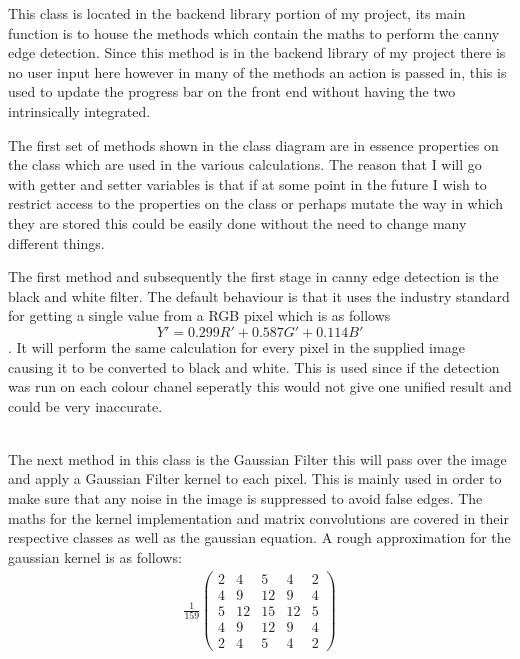 \begin{FlushLeft}
\begin{enumerate}
    This class is located in the backend library portion of my project, its main function is to house the methods which contain the maths to perform the canny edge detection. Since this method is in the backend library of my project there is no user input here however in many of the methods an action is passed in, this is used to update the progress bar on the front end without having the two intrinsically integrated. \\ \bk

    The first set of methods shown in the class diagram are in essence properties on the class which are used in the various calculations. The reason that I will go with getter and setter variables is that if at some point in the future I wish to restrict access to the properties on the class or perhaps mutate the way in which they are stored this could be easily done without the need to change many different things. \\ \bk

    The first method and subsequently the first stage in canny edge detection is the black and white filter. The default behaviour is that it uses the industry standard for getting a single value from a RGB pixel which is as follows $$ Y' = 0.299R' + 0.587G' + 0.114B' $$.  It will perform the same calculation for every pixel in the supplied image causing it to be converted to black and white. This is used since if the detection was run on each colour chanel seperatly this would not give one unified result and could be very inaccurate.\\ 

    \\ \bk

    The next method in this class is the Gaussian Filter this will pass over the image and apply a Gaussian Filter kernel to each pixel. This is mainly used in order to make sure that any noise in the image is suppressed to avoid false edges. The maths for the kernel implementation and matrix convolutions are covered in their respective classes as well as the gaussian equation. A rough approximation for the gaussian kernel is as follows:\\

    \begin{gather*}
        \frac{1}{159}\begin{pmatrix}
            2 & 4 & 5 & 4 & 2 \\
            4 & 9 & 12 & 9 & 4 \\
            5 & 12 & 15 & 12 & 5 \\
            4 & 9 & 12 & 9 & 4 \\
            2 & 4 & 5 & 4 & 2
        \end{pmatrix}
    \end{gather*} \\


\end{enumerate}
\end{FlushLeft}
